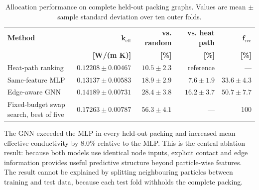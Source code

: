 \documentclass[12pt,a4paper]{article}
\begin{document}
	\begin{table}[!htbp]
		\centering
		\caption{Allocation performance on complete held-out packing graphs. Values
			are mean $\pm$ sample standard deviation over ten outer folds.}
		\label{tab:mlresults}
		\small
		\begin{tabular}{P{3.2cm}rrrr}
			\toprule
			\textbf{Method} & $\boldsymbol{k_{\mathrm{eff}}}$ & \textbf{vs. random} &
			\textbf{vs. heat path} & $\boldsymbol{f_{\mathrm{rec}}}$ \\
			& \textbf{[W/(m K)]} & \textbf{[\%]} & \textbf{[\%]} & \textbf{[\%]} \\
			\midrule
			Heat-path ranking & $0.12208\pm0.00467$ & $10.5\pm2.3$ & reference & --- \\
			Same-feature MLP & $0.13137\pm0.00583$ & $18.9\pm2.9$ & $7.6\pm1.9$ & $33.6\pm4.3$ \\
			Edge-aware GNN & $\mathbf{0.14189\pm0.00731}$ & $\mathbf{28.4\pm3.8}$ & $\mathbf{16.2\pm3.7}$ & $\mathbf{50.7\pm7.7}$ \\
			Fixed-budget swap search, best of five & $0.17263\pm0.00787$ & $56.3\pm4.1$ & --- & 100 \\
			\bottomrule
		\end{tabular}
	\end{table}

	The GNN exceeded the MLP in every held-out packing and increased mean effective
	conductivity by 8.0\% relative to the MLP. This is the central ablation result:
	because both models use identical node inputs, explicit contact and edge
	information provides useful predictive structure beyond particle-wise features.
	The result cannot be explained by splitting neighbouring particles between
	training and test data, because each test fold withholds the complete packing.
\end{document}
